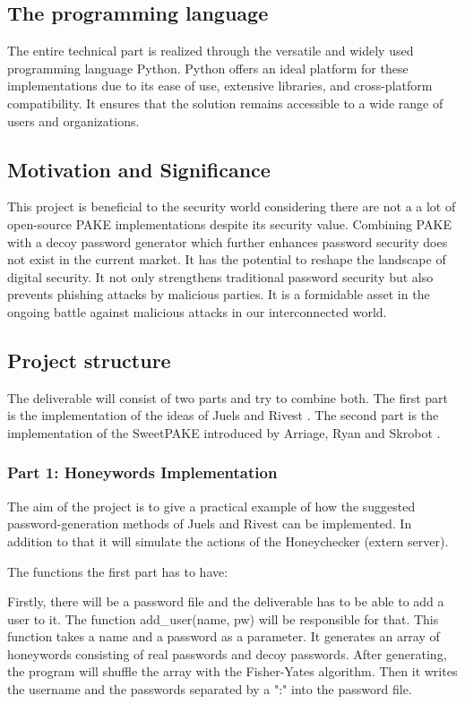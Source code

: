 \documentclass[conference,compsoc]{IEEEtran}
\begin{document}
\subsection{The programming language} The entire technical part is realized
through the versatile and widely used programming language Python. Python
offers an ideal platform for these implementations due to its ease of use,
extensive libraries, and cross-platform compatibility. It ensures that the
solution remains accessible to a wide range of users and organizations.

\subsection{Motivation and Significance} This project is beneficial to the
security world considering there are not a a lot of open-source PAKE
implementations despite its security value. Combining PAKE with a decoy
password generator which further enhances password security does not exist in
the current market. It has the potential to reshape the landscape of digital
security. It not only strengthens traditional password security but also
prevents phishing attacks by malicious parties. It is a formidable asset in the
ongoing battle against malicious attacks in our interconnected world.

\subsection{Project structure} The deliverable will consist of two parts and
try to combine both. The first part is the implementation of the ideas of
Juels and Rivest \cite{juels2013honeywords}. The second part is the implementation
of the SweetPAKE introduced by Arriage, Ryan and Skrobot \cite{sweetpake}. 

\subsubsection{Part 1: Honeywords Implementation} The aim of the project is to
give a practical example of how the suggested password-generation methods of
Juels and Rivest can be implemented. In addition to that it will simulate the
actions of the Honeychecker (extern server).

The functions the first part has to have:

Firstly, there will be a password file and the deliverable has to be able to
add a user to it. The function add\_user(name, pw) will be responsible for
that. This function takes a name and a password as a parameter. It generates an
array of honeywords consisting of real passwords and decoy passwords. After
generating, the program will shuffle the array with the Fisher-Yates algorithm.
Then it writes the username and the passwords separated by a ":" into the
password file.
\end{document}

